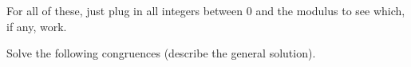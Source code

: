 \begin{questions}

	\begin{answer}
		For all of these, just plug in all integers between 0 and the modulus to see which, if any, work.
	\end{answer}
	
	
	

\question Solve the following congruences (describe the general solution).
\end{questions}
